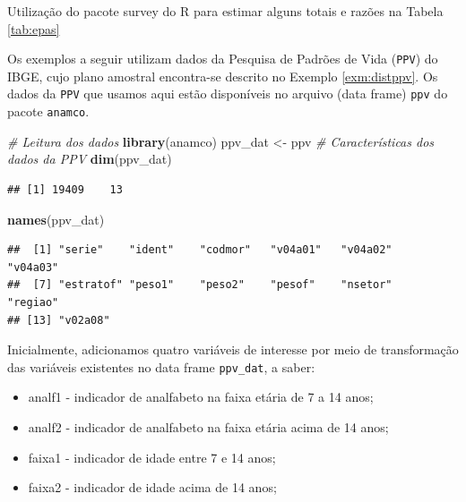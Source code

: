 \documentclass[]{book}
\newenvironment{Shaded}{\begin{snugshade}}{\end{snugshade}}
\newcommand{\KeywordTok}[1]{\textcolor[rgb]{0.13,0.29,0.53}{\textbf{#1}}}
\newcommand{\StringTok}[1]{\textcolor[rgb]{0.31,0.60,0.02}{#1}}
\newcommand{\CommentTok}[1]{\textcolor[rgb]{0.56,0.35,0.01}{\textit{#1}}}
\newcommand{\NormalTok}[1]{#1}
\providecommand{\tightlist}{%
  \setlength{\itemsep}{0pt}\setlength{\parskip}{0pt}}
\theoremstyle{definition}
\theoremstyle{definition}
\theoremstyle{definition}
\theoremstyle{remark}
\let\BeginKnitrBlock\begin \let\EndKnitrBlock\end
\begin{document}
\BeginKnitrBlock{example}
\protect\hypertarget{exm:exe12}{}{\label{exm:exe12} }Utilização do pacote
survey do R para estimar alguns totais e razões na Tabela \ref{tab:epas}
\EndKnitrBlock{example} Os exemplos a seguir utilizam dados da Pesquisa
de Padrões de Vida (\texttt{PPV}) do IBGE, cujo plano amostral
encontra-se descrito no Exemplo \ref{exm:distppv}. Os dados da
\texttt{PPV} que usamos aqui estão disponíveis no arquivo (data frame)
\texttt{ppv} do pacote \texttt{anamco}.

\begin{Shaded}
\begin{Highlighting}[]
\CommentTok{# Leitura dos dados}
\KeywordTok{library}\NormalTok{(anamco)}
\NormalTok{ppv_dat <-}\StringTok{ }\NormalTok{ppv}
\CommentTok{# Características dos dados da PPV}
\KeywordTok{dim}\NormalTok{(ppv_dat)}
\end{Highlighting}
\end{Shaded}

\begin{verbatim}
## [1] 19409    13
\end{verbatim}

\begin{Shaded}
\begin{Highlighting}[]
\KeywordTok{names}\NormalTok{(ppv_dat)}
\end{Highlighting}
\end{Shaded}

\begin{verbatim}
##  [1] "serie"    "ident"    "codmor"   "v04a01"   "v04a02"   "v04a03"  
##  [7] "estratof" "peso1"    "peso2"    "pesof"    "nsetor"   "regiao"  
## [13] "v02a08"
\end{verbatim}

Inicialmente, adicionamos quatro variáveis de interesse por meio de
transformação das variáveis existentes no data frame \texttt{ppv\_dat},
a saber:

\begin{itemize}
\tightlist
\item
  analf1 - indicador de analfabeto na faixa etária de 7 a 14 anos;
\item
  analf2 - indicador de analfabeto na faixa etária acima de 14 anos;
\item
  faixa1 - indicador de idade entre 7 e 14 anos;
\item
  faixa2 - indicador de idade acima de 14 anos;
\end{itemize}
\end{document}
